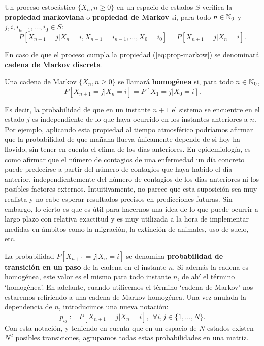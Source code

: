 \begin{definicion}
    Un proceso estocástico $\{X_n,n\geq 0\}$ en un espacio de estados $S$ verifica la \textbf{propiedad markoviana} o \textbf{propiedad de Markov} si, para todo $n\in\mathbb{N}_0$ y $j,i,i_{n-1},\dots, i_0 \in S$:
    \begin{equation}
        \label{eq:prop-markow}
        P[X_{n+1}=j | X_n=i, X_{n-1}=i_{n-1}, \dots, X_0=i_0 ] = P[X_{n+1}=j | X_n=i].
    \end{equation}

    En caso de que el proceso cumpla la propiedad (\ref{eq:prop-markow}) se denominará \textbf{cadena de Markov discreta}.

    Una cadena de Markov $\{X_n, n\geq 0\}$ se llamará \textbf{homogénea} si, para todo $n\in\mathbb{N}_0$,
    \begin{equation}
        \label{eq:cad-homogenea}
        P[X_{n+1}=j|X_n=i] = P[X_1=j|X_0=i].
    \end{equation}
\end{definicion}

Es decir, la probabilidad de que en un instante $n+1$ el sistema se encuentre en el estado $j$ es independiente de lo que haya ocurrido en los instantes anteriores a $n$. Por ejemplo, aplicando esta propiedad al tiempo atmosférico podríamos afirmar que la probabilidad de que mañana llueva únicamente depende de si hoy ha llovido, sin tener en cuenta el clima de los días anteriores. En epidemiología, es como afirmar que el número de contagios de una enfermedad un día concreto puede predecirse a partir del número de contagios que haya habido el día anterior, independientemente del número de contagios de los días anteriores ni los posibles factores externos. Intuitivamente, no parece que esta suposición sea muy realista y no cabe esperar resultados precisos en predicciones futuras. Sin embargo, lo cierto es que es útil para hacernos una idea de lo que puede ocurrir a largo plazo con relativa exactitud y es muy utilizada a la hora de implementar medidas en ámbitos como la migración, la extinción de animales, uso de suelo, etc.

La probabilidad $P[X_{n+1}=j|X_n=i]$ se denomina \textbf{probabilidad de transición en un paso} de la cadena en el instante $n$. Si además la cadena es homogénea, este valor es el mismo para todo instante $n$, de ahí el término `homogénea'. En adelante, cuando utilicemos el término `cadena de Markov' nos estaremos refiriendo a una cadena de Markov homogénea. Una vez anulada la dependencia de $n$, introducimos una nueva notación:
$$
p_{ij} := P[X_{n+1}=j|X_n=i], \ \ \forall i,j \in \{1,\dots,N\}.
$$
Con esta notación, y teniendo en cuenta que en un espacio de $N$ estados existen $N^2$ posibles transiciones, agrupamos todas estas probabilidades en una matriz.

